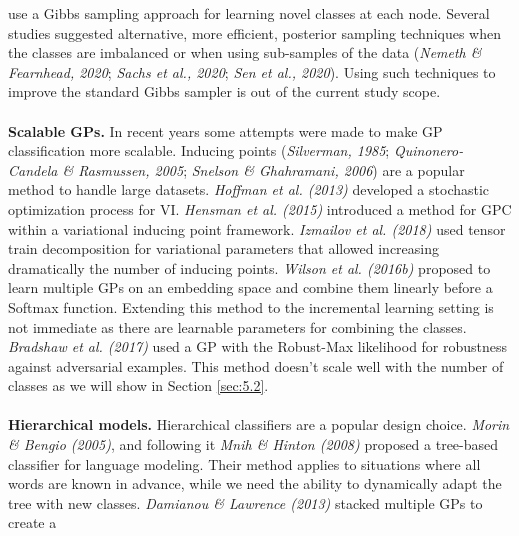 \documentclass[preprint,11pt]{elsarticle}
\begin{document}
    use a Gibbs sampling approach for learning novel classes
    at each node. Several studies suggested alternative, more
    efficient, posterior sampling techniques when the classes are
    imbalanced or when using sub-samples of the data (\textit{Nemeth
    \& Fearnhead, 2020}\cite{nemeth2020stochastic}; \textit{Sachs et al., 2020}\cite{sachs2020posterior}; \textit{Sen et al., 2020}\cite{sen2020efficient}). Using
    such techniques to improve the standard Gibbs sampler
    is out of the current study scope.
    \\
    \\
    \textbf{Scalable GPs.} In recent years some attempts were made
    to make GP classification more scalable. Inducing points
    (\textit{Silverman, 1985}\cite{silverman1985some}; \textit{Quinonero-Candela \& Rasmussen, 2005}\cite{quinonero2005unifying};
    \textit{Snelson \& Ghahramani, 2006}\cite{snelson2006sparse}) are a popular method to
    handle large datasets. \textit{Hoffman et al. (2013)}\cite{hoffman2013stochastic} developed
    a stochastic optimization process for VI. \textit{Hensman et al.
    (2015)}\cite{hensman2015scalable} introduced a method for GPC within a variational inducing
    point framework. \textit{Izmailov et al. (2018)}\cite{izmailov2018scalable} used tensor
    train decomposition for variational parameters that allowed
    increasing dramatically the number of inducing points. \textit{Wilson
    et al. (2016b)}\cite{wilson2016stochastic} proposed to learn multiple GPs on an embedding
    space and combine them linearly before a Softmax
    function. Extending this method to the incremental learning
    setting is not immediate as there are learnable parameters
    for combining the classes. \textit{Bradshaw et al. (2017)}\cite{bradshaw2017adversarial} used a
    GP with the Robust-Max likelihood for robustness against
    adversarial examples. This method doesn’t scale well with
    the number of classes as we will show in Section \ref{sec:5.2}.
    \\
    \\
    \textbf{Hierarchical models.} Hierarchical classifiers are a popular
    design choice. \textit{Morin \& Bengio (2005)}\cite{morin2005hierarchical}, and following
    it \textit{Mnih \& Hinton (2008)}\cite{mnih2008scalable} proposed a tree-based classifier
    for language modeling. Their method applies to situations
    where all words are known in advance, while we need the
    ability to dynamically adapt the tree with new classes. \textit{Damianou
    \& Lawrence (2013)}\cite{damianou2013deep} stacked multiple GPs to create a
\end{document}
